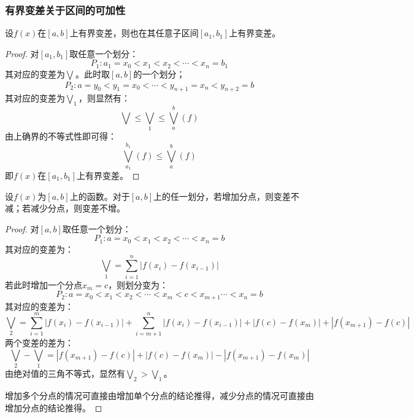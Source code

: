 \subsubsection{有界变差关于区间的可加性}
\begin{theorem}
	设$f(x)$在$[a,b]$上有界变差，则也在其任意子区间$[a_1,b_1]$上有界变差。
\end{theorem}
\begin{proof}
	对$[a_1,b_1]$取任意一个划分：
	\begin{equation*}
		P_1:a_1=x_0<x_1<x_2<\cdots<x_n=b_1
	\end{equation*}
	其对应的变差为$\bigvee_{}^{}$。此时取$[a,b]$的一个划分；
	\begin{equation*}
		P_2:a=y_0<y_1=x_0<\cdots<y_{n+1}=x_n<y_{n+2}=b
	\end{equation*}
	其对应的变差为$\bigvee_1$，则显然有：
	\begin{equation*}
		\bigvee_{}^{}\leqslant\bigvee_1\leqslant\bigvee_{a}^{b}(f)
	\end{equation*}
	由上确界的不等式性即可得：
	\begin{equation*}
		\bigvee_{a_1}^{b_1}(f)\leqslant\bigvee_{a}^{b}(f)
	\end{equation*}
	即$f(x)$在$[a_1,b_1]$上有界变差。
\end{proof}
\begin{lemma}
	设$f(x)$为$[a,b]$上的函数。对于$[a,b]$上的任一划分，若增加分点，则变差不减；若减少分点，则变差不增。
\end{lemma}
\begin{proof}
	对$[a,b]$取任意一个划分：
	\begin{equation*}
		P_1:a=x_0<x_1<x_2<\cdots<x_n=b
	\end{equation*}
	其对应的变差为：
	\begin{equation*}
		\bigvee_1=\sum_{i=1}^{n}|f(x_i)-f(x_{i-1})|
	\end{equation*}
	若此时增加一个分点$x_m=c$，则划分变为：
	\begin{equation*}
		P_2:a=x_0<x_1<x_2<\cdots<x_m<c<x_{m+1}\cdots<x_n=b
	\end{equation*}
	其对应的变差为：
	\begin{equation*}
		\bigvee_2=\sum_{i=1}^{m}|f(x_i)-f(x_{i-1})|+\sum_{i=m+1}^{n}|f(x_i)-f(x_{i-1})|+|f(c)-f(x_m)|+|f(x_{m+1})-f(c)|
	\end{equation*}
	两个变差的差为：
	\begin{equation*}
		\bigvee_2-\bigvee_1=|f(x_{m+1})-f(c)|+|f(c)-f(x_m)|-|f(x_{m+1})-f(x_m)|
	\end{equation*}
	由绝对值的三角不等式，显然有$\bigvee_2>\bigvee_1$。\par
	增加多个分点的情况可直接由增加单个分点的结论推得，减少分点的情况可直接由增加分点的结论推得。
\end{proof}
